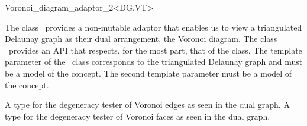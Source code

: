 

\begin{ccRefClass}{Voronoi_diagram_adaptor_2<DG,VT>}


\ccDefinition

The class \ccRefName\ provides a non-mutable adaptor that enables us
to view a triangulated Delaunay graph as their dual arrangement, the
Voronoi diagram. The class \ccRefName\ provides an API that respects,
for the most part, that of the
 class.
The template parameter of the \ccRefName\ class corresponds to the
triangulated Delaunay graph and must be a model of the
 concept. The second template parameter must be a
model of the  concept.




\ccTypes

\ccThreeToTwo
%
\ccGlue
{}
\ccGlue
{}
\ccGlue
{}
\ccGlue
{}
{A type for the degeneracy tester of Voronoi edges as seen in the dual graph.}
\ccGlue
{}
{A type for the degeneracy tester of Voronoi faces as seen in the dual graph.}
%
%


\end{ccRefClass}

